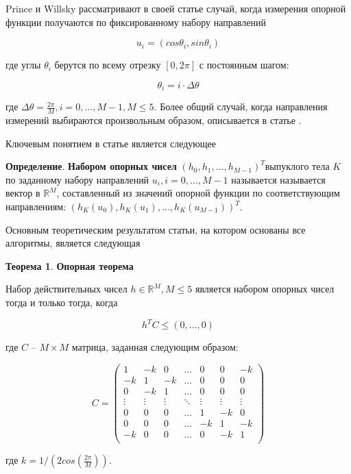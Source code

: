 \documentclass[a4paper,12pt, titlepage]{article}
\begin{document}
Prince и Willsky рассматривают в своей статье случай, когда измерения опорной
функции получаются по фиксированному набору направлений

$$u_{i} = (cos \theta_{i}, sin \theta_{i})$$

где углы $\theta_{i}$ берутся по всему отрезку $[0, 2 \pi]$ с постоянным шагом:

$$\theta_{i} = i \cdot \Delta \theta$$

где $\Delta \theta = \frac{2 \pi}{M}, i = 0, \ldots, M - 1, M \leq 5$. Более
общий случай, когда направления измерений выбираются произвольным образом,
описывается в статье
\cite[Lele - Kulkarni - Willsky (1992)]{journals/josaa/LeleKW92}.

Ключевым понятием в статье является следующее

\begin{flushleft}
 \textbf{Определение}. \textbf{Набором опорных чисел}
 $(h_{0}, h_{1}, \ldots, h_{M - 1})^{T}$выпуклого тела $K$ по заданному набору
 направлений $u_{i}, i = 0, \ldots, M - 1$ называется называется вектор в
 $\mathbb{R}^{M}$, составленный из значений опорной функции по соответствующим
 направлениям: $(h_{K}(u_{0}), h_{K}(u_{1}), \ldots, h_{K}(u_{M - 1}))^{T}$.
\end{flushleft}

Основным теоретическим результатом статьи, на котором основаны все алгоритмы,
является следующая

\begin{flushleft}
 \textbf{Теорема 1}. \textbf{Опорная теорема}

  Набор действительных чисел $h \in \mathbb{R}^{M}, M \leq 5$ является набором
  опорных чисел тогда и только тогда, когда
  
  $$h^{T} C \leq (0, \ldots, 0)$$
  
  где $C$ -- $M \times M$ матрица, заданная следующим образом:
  
  $$
  C = 
  \left(
  \begin{array}{ccccccc}
       1 &     -k &      0 & \ldots &      0 &      0 &     -k \\
      -k &      1 &     -k & \ldots &      0 &      0 &      0 \\
       0 &     -k &      1 & \ldots &      0 &      0 &      0 \\
  \vdots & \vdots & \vdots & \ddots & \vdots & \vdots & \vdots \\
       0 &      0 &      0 & \ldots &      1 &     -k &      0 \\
       0 &      0 &      0 & \ldots &     -k &      1 &     -k \\
      -k &      0 &      0 & \ldots &      0 &     -k &      1 \\
 \end{array}
 \right)
  $$
  
  где $k = 1 / (2 cos(\frac{2 \pi}{M}))$.

\end{flushleft}
\end{document}

